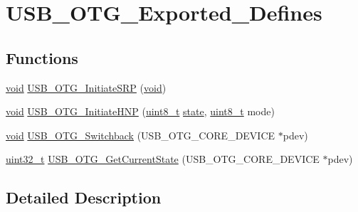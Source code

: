 \hypertarget{group___u_s_b___o_t_g___exported___defines}{\section{U\-S\-B\-\_\-\-O\-T\-G\-\_\-\-Exported\-\_\-\-Defines}
\label{group___u_s_b___o_t_g___exported___defines}
}
\subsection*{Functions}
\begin{DoxyCompactItemize}
\item 
\hyperlink{group___n_a_m_e_ga18028b8badbf1ea7e704ccac3c488e82}{void} \hyperlink{group___u_s_b___o_t_g___exported___defines_gabf5090fe9944d83e3b04037873879a84}{U\-S\-B\-\_\-\-O\-T\-G\-\_\-\-Initiate\-S\-R\-P} (\hyperlink{group___n_a_m_e_ga18028b8badbf1ea7e704ccac3c488e82}{void})
\item 
\hyperlink{group___n_a_m_e_ga18028b8badbf1ea7e704ccac3c488e82}{void} \hyperlink{group___u_s_b___o_t_g___exported___defines_ga05aa027419d7da526e325ee55104b44d}{U\-S\-B\-\_\-\-O\-T\-G\-\_\-\-Initiate\-H\-N\-P} (\hyperlink{stdint_8h_aba7bc1797add20fe3efdf37ced1182c5}{uint8\-\_\-t} \hyperlink{posix_2posix_2pios__flashfs__logfs_8c_a13a6109e91ad12705df96a0f2743c630}{state}, \hyperlink{stdint_8h_aba7bc1797add20fe3efdf37ced1182c5}{uint8\-\_\-t} mode)
\item 
\hyperlink{group___n_a_m_e_ga18028b8badbf1ea7e704ccac3c488e82}{void} \hyperlink{group___u_s_b___o_t_g___exported___defines_gae29e0b2f933142ba7a31d0cbac8979ae}{U\-S\-B\-\_\-\-O\-T\-G\-\_\-\-Switchback} (U\-S\-B\-\_\-\-O\-T\-G\-\_\-\-C\-O\-R\-E\-\_\-\-D\-E\-V\-I\-C\-E $\ast$pdev)
\item 
\hyperlink{stdint_8h_a435d1572bf3f880d55459d9805097f62}{uint32\-\_\-t} \hyperlink{group___u_s_b___o_t_g___exported___defines_gadb531025c4f37b4366c42253bc9ff5ac}{U\-S\-B\-\_\-\-O\-T\-G\-\_\-\-Get\-Current\-State} (U\-S\-B\-\_\-\-O\-T\-G\-\_\-\-C\-O\-R\-E\-\_\-\-D\-E\-V\-I\-C\-E $\ast$pdev)
\end{DoxyCompactItemize}


\subsection{Detailed Description}


